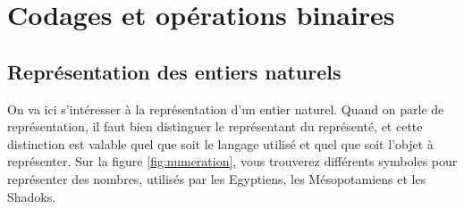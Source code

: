 \chapter{Codages et opérations binaires}



\section{Représentation des entiers naturels}

On va ici s'intéresser à la représentation d'un entier naturel. Quand on parle de représentation, il faut bien distinguer le représentant du représenté, et cette distinction est valable quel que soit le langage utilisé et quel que soit l'objet à représenter. Sur la figure \ref{fig:numeration}, vous trouverez différents symboles pour représenter des nombres, utilisés par les Egyptiens, les Mésopotamiens et les Shadoks.

